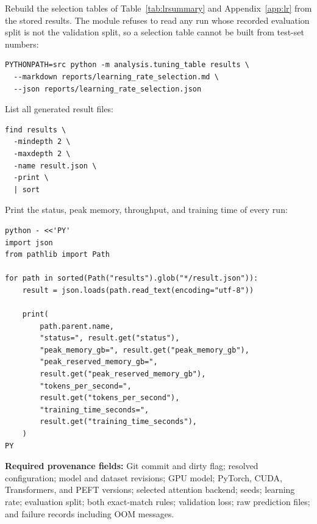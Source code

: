 \documentclass[10pt]{article}
\begin{document}
Rebuild the selection tables of Table~\ref{tab:lrsummary} and Appendix~\ref{app:lr}
from the stored results. The module refuses to read any run whose recorded
evaluation split is not the validation split, so a selection table cannot be
built from test-set numbers:
\begin{verbatim}
PYTHONPATH=src python -m analysis.tuning_table results \
  --markdown reports/learning_rate_selection.md \
  --json reports/learning_rate_selection.json
\end{verbatim}

List all generated result files:
\begin{verbatim}
find results \
  -mindepth 2 \
  -maxdepth 2 \
  -name result.json \
  -print \
  | sort
\end{verbatim}

Print the status, peak memory, throughput, and training time of every run:
\begin{verbatim}
python - <<'PY'
import json
from pathlib import Path

for path in sorted(Path("results").glob("*/result.json")):
    result = json.loads(path.read_text(encoding="utf-8"))

    print(
        path.parent.name,
        "status=", result.get("status"),
        "peak_memory_gb=", result.get("peak_memory_gb"),
        "peak_reserved_memory_gb=",
        result.get("peak_reserved_memory_gb"),
        "tokens_per_second=",
        result.get("tokens_per_second"),
        "training_time_seconds=",
        result.get("training_time_seconds"),
    )
PY
\end{verbatim}

\textbf{Required provenance fields:} Git commit and dirty flag; resolved configuration; model and dataset revisions; GPU model; PyTorch, CUDA, Transformers, and PEFT versions; selected attention backend; seeds; learning rate; evaluation split; both exact-match rules; validation loss; raw prediction files; and failure records including OOM messages.
\end{document}
